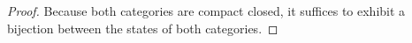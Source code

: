 \begin{proof}
Because both categories are compact closed, it suffices to exhibit a bijection between the states of both categories.
%
%
%
%
%
%
%
%
%
%
%
%
%
%
%
%
%
%

\end{proof}
